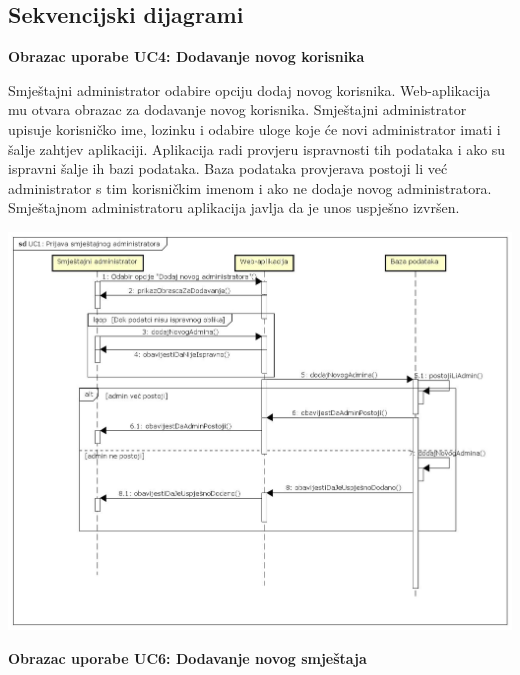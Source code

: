 			\subsection{Sekvencijski dijagrami}
			\textbf{Obrazac uporabe UC4: Dodavanje novog korisnika}
			
			Smještajni administrator odabire opciju dodaj novog korisnika. Web-aplikacija mu otvara obrazac za dodavanje novog korisnika. Smještajni administrator upisuje korisničko ime, lozinku i odabire uloge koje će novi administrator imati i šalje zahtjev aplikaciji. Aplikacija radi provjeru ispravnosti tih podataka i ako su ispravni šalje ih bazi podataka. Baza podataka provjerava postoji li već administrator s tim korisničkim imenom i ako ne dodaje novog administratora. Smještajnom administratoru aplikacija javlja da je unos uspješno izvršen.
			{
			\begin{center} 
			\includegraphics[scale=0.33]{./dijagrami/sec_uc4}
			\end{center}
			}
			\eject
			
			
			\textbf{Obrazac uporabe UC6: Dodavanje novog smještaja}
			
